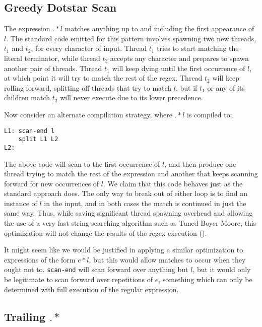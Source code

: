 \subsection{Greedy Dotstar Scan}
\label{section:greedydotstarscan}

The expression $.*l$ matches anything up to and including the first
appearance of $l$. The standard code emitted for this pattern involves
spawning two new threads, $t_1$ and $t_2$, for every character of input.
Thread $t_1$ tries to start matching the literal terminator, while thread $t_2$
accepts any character and prepares to spawn another pair of threads.
Thread $t_1$ will keep dying until the first occurrence of $l$,
at which point it will try to match the rest of the regex.
Thread $t_2$ will keep rolling forward, splitting off threads that try
to match $l$, but if $t_1$ or any of its children match
$t_2$ will never execute due to its lower precedence.

Now consider an alternate compilation strategy, where $.*l$ is compiled
to:

\begin{verbatim}
L1: scan-end l
    split L1 L2
L2: 
\end{verbatim}

The above code will scan to the first occurrence of $l$, and then produce
one thread trying to match the rest of the expression and another that
keeps scanning forward for new occurrences of $l$. We claim that this
code behaves just as the standard approach does. The only way to
break out of either loop is to find an instance of $l$ in the input,
and in both cases the match is continued in just the same way. Thus,
while saving significant thread spawning overhead and allowing the use
of a very fast string searching algorithm such as Tuned Boyer-Moore, this
optimization will not change the results of the regex execution
(\cite{Hume1991}).

It might seem like we would be justified in applying a similar 
optimization to expressions of the form $e*l$, but this would allow
matches to occur when they ought not to.
\verb'scan-end' will scan forward over anything
but $l$, but it would only be legitimate to scan forward over repetitions
of $e$, something which can only be determined with full execution of
the regular expression.

\subsection{Trailing $.*$}

